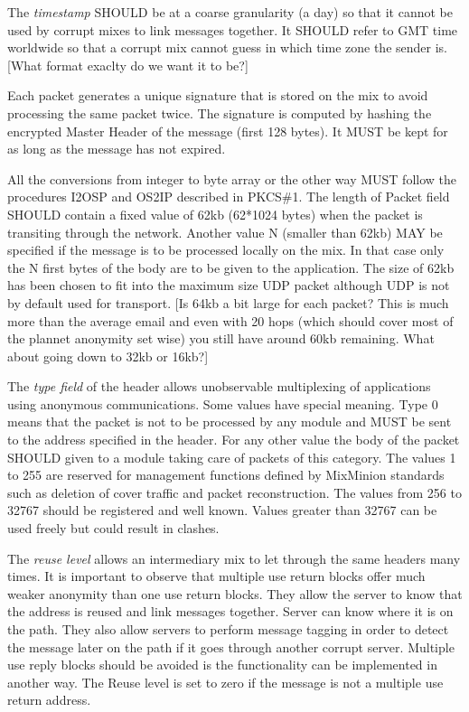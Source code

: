 \documentclass{article}
\begin{document}
The \emph{timestamp} SHOULD be at a coarse granularity (a day) so that
it cannot be used by corrupt mixes to link messages together. It
SHOULD refer to GMT time worldwide so that a corrupt mix cannot guess
in which time zone the sender is. [What format exaclty do we want it
to be?]

Each packet generates a unique signature that is stored on the mix to avoid 
processing the same packet twice. The signature is computed by hashing the
encrypted Master Header of the message (first 128 bytes). It MUST be kept for
as long as the message has not expired.

All the conversions from integer to byte array or the other way MUST
follow the procedures I2OSP and OS2IP described in PKCS\#1. The length
of Packet field SHOULD contain a fixed value of 62kb (62*1024 bytes)
when the packet is transiting through the network. Another value N
(smaller than 62kb) MAY be specified if the message is to be processed
locally on the mix. In that case only the N first bytes of the body
are to be given to the application.  The size of 62kb has been chosen
to fit into the maximum size UDP packet although UDP is not by default
used for transport.  [Is 64kb a bit large for each packet? This is
much more than the average email and even with 20 hops (which should
cover most of the plannet anonymity set wise) you still have around
60kb remaining. What about going down to 32kb or 16kb?]

The \emph{type field} of the header allows unobservable multiplexing of
applications using anonymous communications. Some values have special
meaning. Type 0 means that the packet is not to be processed by any
module and MUST be sent to the address specified in the header. For
any other value the body of the packet SHOULD given to a module taking
care of packets of this category. The values 1 to 255 are reserved for
management functions defined by MixMinion standards such as deletion
of cover traffic and packet reconstruction. The values from 256 to
32767 should be registered and well known. Values greater than 32767
can be used freely but could result in clashes.

The \emph{reuse level} allows an intermediary mix to let through the same
headers many times. It is important to observe that multiple use
return blocks offer much weaker anonymity than one use return
blocks. They allow the server to know that the address is reused and
link messages together. Server can know where it is on the path. They
also allow servers to perform message tagging in order to detect the
message later on the path if it goes through another corrupt
server. Multiple use reply blocks should be avoided is the
functionality can be implemented in another way. The Reuse level is
set to zero if the message is not a multiple use return address.
\end{document}
